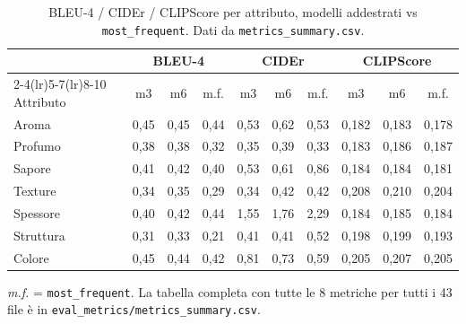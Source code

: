 \documentclass[11pt,a4paper]{article}
\begin{document}
\begin{table}[ht]
\centering
\small
\setlength{\tabcolsep}{4pt}
\caption{BLEU-4 / CIDEr / CLIPScore per attributo, modelli addestrati vs
\texttt{most\_frequent}. Dati da \texttt{metrics\_summary.csv}.}
\begin{tabular}{@{}l ccc ccc ccc@{}}
\toprule
& \multicolumn{3}{c}{BLEU-4} & \multicolumn{3}{c}{CIDEr} & \multicolumn{3}{c}{CLIPScore}\\
\cmidrule(lr){2-4}\cmidrule(lr){5-7}\cmidrule(lr){8-10}
Attributo & m3 & m6 & m.f. & m3 & m6 & m.f. & m3 & m6 & m.f.\\
\midrule
Aroma     & 0,45 & 0,45 & 0,44 & 0,53 & 0,62 & 0,53 & 0,182 & 0,183 & 0,178\\
Profumo   & 0,38 & 0,38 & 0,32 & 0,35 & 0,39 & 0,33 & 0,183 & 0,186 & 0,187\\
Sapore    & 0,41 & 0,42 & 0,40 & 0,53 & 0,61 & 0,86 & 0,184 & 0,184 & 0,181\\
Texture   & 0,34 & 0,35 & 0,29 & 0,34 & 0,42 & 0,42 & 0,208 & 0,210 & 0,204\\
Spessore  & 0,40 & 0,42 & 0,44 & 1,55 & 1,76 & 2,29 & 0,184 & 0,185 & 0,184\\
Struttura & 0,31 & 0,33 & 0,21 & 0,41 & 0,41 & 0,52 & 0,198 & 0,199 & 0,193\\
Colore    & 0,45 & 0,44 & 0,42 & 0,81 & 0,73 & 0,59 & 0,205 & 0,207 & 0,205\\
\bottomrule
\end{tabular}
\end{table}

\noindent\textit{m.f.} = \texttt{most\_frequent}. La tabella completa con tutte le
8 metriche per tutti i 43 file è in \texttt{eval\_metrics/metrics\_summary.csv}.
\end{document}
